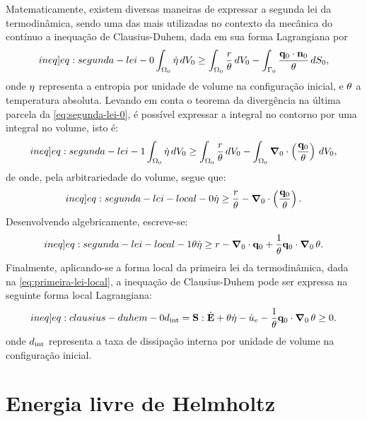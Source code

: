 \documentclass[Tese.tex]{subfiles}
\begin{document}
Matematicamente, existem diversas maneiras de expressar a segunda lei da termodinâmica, sendo uma das mais utilizadas no contexto da mecânica do contínuo a inequação de Clausius-Duhem, dada em sua forma Lagrangiana por
\begin{equation}\label[ineq]{eq:segunda-lei-0}
\displaystyle\int_{\domVoli}\dotentropy\,d\voli \geq \int_{\domVoli} \dfrac{\calorInt}{\temp}\,d\voli - \int_{\domConi} \dfrac{\qi\cdot\normali}{\temp}\,d\coni,
\end{equation}
onde $\eta$ representa a entropia por unidade de volume na configuração inicial, e $\theta$ a temperatura absoluta. Levando em conta o teorema da divergência na última parcela da \cref{eq:segunda-lei-0}, é possível expressar a integral no contorno por uma integral no volume, isto é:
\begin{equation}\label[ineq]{eq:segunda-lei-1}
\displaystyle\int_{\domVoli}\dotentropy\,d\voli \geq \int_{\domVoli} \dfrac{\calorInt}{\temp}\,d\voli - \int_{\domVoli} \gradientei\cdot\left(\dfrac{\qi}{\temp}\right)\,d\voli,
\end{equation}
de onde, pela arbitrariedade do volume, segue que:
\begin{equation}\label[ineq]{eq:segunda-lei-local-0}
\dotentropy \geq \dfrac{\calorInt}{\temp} - \gradientei\cdot\left(\dfrac{\qi}{\temp}\right).
\end{equation}
Desenvolvendo algebricamente, escreve-se:
\begin{equation}\label[ineq]{eq:segunda-lei-local-1}
\temp \dotentropy \geq \calorInt - \gradientei\cdot\qi + \dfrac{1}{\temp}\qi\cdot\gradientei\,\temp.
\end{equation}
Finalmente, aplicando-se a forma local da primeira lei da termodinâmica, dada na \cref{eq:primeira-lei-local}, a inequação de Clausius-Duhem pode ser expressa na seguinte forma local Lagrangiana:
\begin{equation}\label[ineq]{eq:clausius-duhem-0}
\dissipation = \S:\dotE + \temp \dotentropy - \dotenergiaint - \dfrac{1}{\temp}\qi\cdot\gradientei\,\temp \geq 0.
\end{equation}
onde $d_\text{int}$ representa a taxa de dissipação interna por unidade de volume na configuração inicial. %

\section{Energia livre de Helmholtz}
\end{document}
